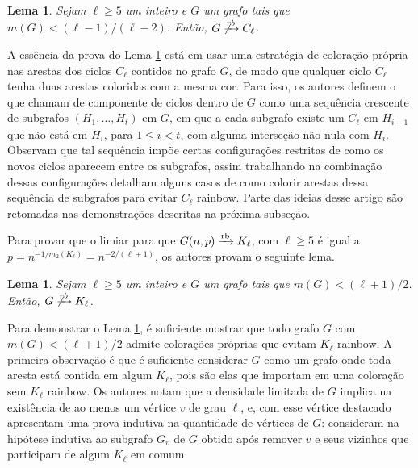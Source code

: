 \documentclass[11pt,twoside,a4paper]{book}
\def\rbarrow{\xrightarrow[]{\raisebox{0.0mm}[0mm]{$\scriptstyle \rm rb$}}}
\newtheorem{lema}      [teorema] {Lema}
\theoremstyle{note}
\begin{document}
\begin{lema}\label{lema:rbciclos}\cite{barros2021anti}
         Sejam $\ell \geq 5$ um inteiro e $G$ um grafo tais que
         $m(G) < (\ell-1)/(\ell-2)$. 
         Então, $G \not\xrightarrow[]{rb} C_\ell$.
\end{lema}
    
A essência da prova do Lema \ref{lema:rbciclos} está em usar uma estratégia de coloração própria nas arestas dos ciclos $C_\ell$ contidos no grafo $G$, de modo que qualquer ciclo $C_\ell$ tenha duas arestas coloridas com a mesma cor.
%
Para isso, os autores definem o que chamam de componente de ciclos dentro de $G$ como uma sequência crescente de subgrafos $(H_1, \ldots, H_t)$ em $G$, em que a cada subgrafo existe um $C_\ell$ em $H_{i+1}$ que não está em $H_i$, para $1 \leq i < t$, com alguma interseção não-nula com $H_i$.
%
Observam que tal sequência impõe certas configurações restritas de como os novos ciclos aparecem entre os subgrafos, assim trabalhando na combinação dessas configurações detalham alguns casos de como colorir arestas dessa sequência de subgrafos para evitar $C_\ell$ rainbow.
     Parte das ideias desse artigo são retomadas nas demonstrações descritas na próxima subseção.
 
 
   Para provar que o limiar para que $G(n,p) \rbarrow K_\ell$, com $\ell \geq 5$ é igual a $p = n^{-1/m_2(K_\ell)} = n^{- 2/(\ell+1)}$, os autores provam o seguinte lema.
   
   \begin{lema}\label{lema:rbcomplete}\cite{kohayakawa2019anti}
         Sejam $\ell \geq 5$ um inteiro e $G$ um grafo tais que 
         $m(G) < (\ell+1)/2$.
         Então, $G \not\xrightarrow[]{rb} K_\ell$.
    \end{lema}
    Para demonstrar o Lema \ref{lema:rbcomplete}, é suficiente mostrar que todo grafo $G$ com $m(G) < (\ell+1)/2$  admite colorações próprias que evitam $K_\ell$ rainbow. 
    A primeira observação é que é suficiente considerar $G$ como um grafo onde toda aresta está contida em algum $K_\ell$, pois são elas que importam em uma coloração sem $K_\ell$ rainbow. 
    Os autores notam que a densidade limitada de $G$ implica na existência de ao menos um vértice $v$ de grau $\ell$, e, com esse vértice destacado apresentam uma prova indutiva na quantidade de vértices de $G$: consideram na hipótese indutiva ao subgrafo $G_v$ de $G$ obtido após remover $v$ e seus vizinhos que participam de algum $K_\ell$ em comum.
    
\end{document}
